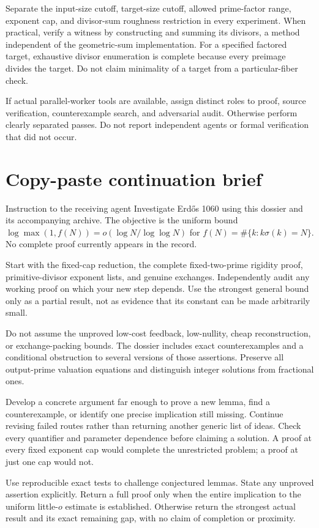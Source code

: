 Separate the input-size cutoff, target-size cutoff, allowed prime-factor range,
exponent cap, and divisor-sum roughness restriction in every experiment.
When practical, verify a witness by constructing and summing its divisors, a
method independent of the geometric-sum implementation. For a specified factored
target, exhaustive divisor enumeration is complete because every preimage
divides the target. Do not claim minimality of a target from a particular-fiber
check.

If actual parallel-worker tools are available, assign distinct roles to proof,
source verification, counterexample search, and adversarial audit. Otherwise
perform clearly separated passes. Do not report independent agents or formal
verification that did not occur.

\section{Copy-paste continuation brief}
\begin{statusbox}{Instruction to the receiving agent}
Investigate Erd\H{o}s 1060 using this dossier and its accompanying archive.
The objective is the uniform bound
$\log\max(1,f(N))=o(\log N/\log\log N)$ for $f(N)=\#\{k:k\sigma(k)=N\}$.
No complete proof currently appears in the record.

Start with the fixed-cap reduction, the complete fixed-two-prime rigidity
proof, primitive-divisor exponent lists, and genuine exchanges. Independently
audit any working proof on which your new step depends. Use the strongest
general bound only as a partial result, not as evidence that its constant can
be made arbitrarily small.

Do not assume the unproved low-cost feedback, low-nullity, cheap reconstruction,
or exchange-packing bounds. The dossier includes exact counterexamples and a
conditional obstruction to several versions of those assertions. Preserve
all output-prime valuation equations and distinguish integer solutions from
fractional ones.

Develop a concrete argument far enough to prove a new lemma, find a
counterexample, or identify one precise implication still missing. Continue
revising failed routes rather than returning another generic list of ideas.
Check every quantifier and parameter dependence before claiming a solution.
A proof at every fixed exponent cap would complete the unrestricted problem;
a proof at just one cap would not.

Use reproducible exact tests to challenge conjectured lemmas. State any
unproved assertion explicitly. Return a full proof only when the entire
implication to the uniform little-$o$ estimate is established. Otherwise return
the strongest actual result and its exact remaining gap, with no claim of
completion or proximity.
\end{statusbox}

